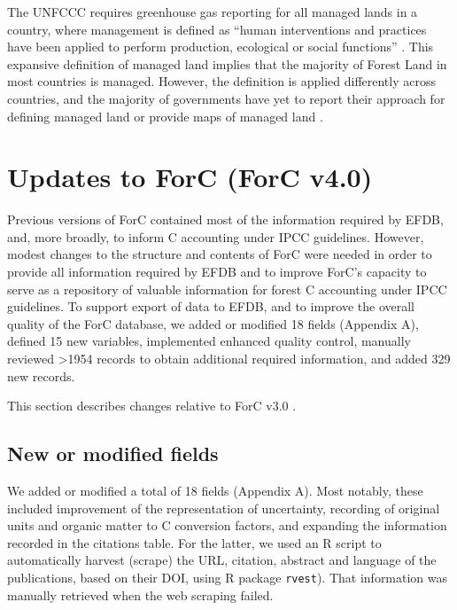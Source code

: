 \documentclass[, manuscript]{copernicus}
\begin{document}
The UNFCCC requires greenhouse gas reporting for all managed lands in a
country, where management is defined as ``human interventions and
practices have been applied to perform production, ecological or social
functions'' \citep{ipcc_2006_2006}. This expansive definition of managed
land implies that the majority of Forest Land in most countries is
managed. However, the definition is applied differently across
countries, and the majority of governments have yet to report their
approach for defining managed land or provide maps of managed land
\citep{ogle_delineating_2018, deng_comparing_2021}.

\section{Updates to ForC (ForC v4.0)}

Previous versions of ForC
\citep{anderson-teixeira_carbon_2016, anderson-teixeira_forc_2018, anderson-teixeira_carbon_2021}
contained most of the information required by EFDB, and, more broadly,
to inform C accounting under IPCC guidelines. However, modest changes to
the structure and contents of ForC were needed in order to provide all
information required by EFDB and to improve ForC's capacity to serve as
a repository of valuable information for forest C accounting under IPCC
guidelines. To support export of data to EFDB, and to improve the
overall quality of the ForC database, we added or modified 18 fields
(Appendix A), defined 15 new variables, implemented enhanced quality
control, manually reviewed \textgreater1954 records to obtain additional
required information, and added 329 new records.

This section describes changes relative to ForC v3.0
\citep{anderson-teixeira_carbon_2021}.

\subsection{New or modified fields}

We added or modified a total of 18 fields (Appendix A). Most notably,
these included improvement of the representation of uncertainty,
recording of original units and organic matter to C conversion factors,
and expanding the information recorded in the citations table. For the
latter, we used an R script to automatically harvest (scrape) the URL,
citation, abstract and language of the publications, based on their DOI,
using R package \texttt{rvest}\citep{rvest}). That information was
manually retrieved when the web scraping failed.
\end{document}
